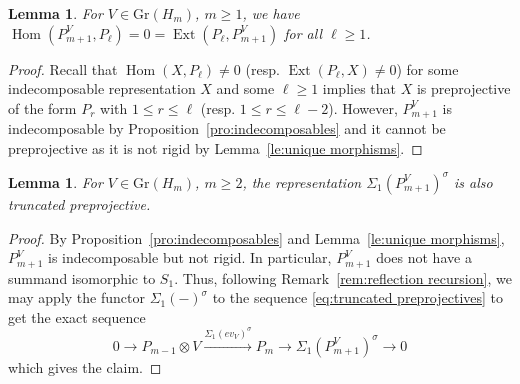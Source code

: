\documentclass{amsart}
\newtheorem{lemma}[theorem]{Lemma}
\numberwithin{equation}{section}
\newcommand\udim{{\underline{\dim}\, }}
\newcommand{\Ext}{\operatorname{Ext}}
\newcommand{\Gr}{\mathrm{Gr}}
\newcommand{\Hom}{\operatorname{Hom}}
\begin{document}
\begin{lemma}
  \label{le:basic homological properties}
  For $V\in\Gr(H_m)$, $m\ge1$, we have $\Hom(P_{m+1}^V,P_\ell)=0=\Ext(P_\ell,P_{m+1}^V)$ for all $\ell\ge1$.
\end{lemma}
\begin{proof}
  Recall that $\Hom(X,P_\ell)\ne0$ (resp. $\Ext(P_\ell,X)\ne0$) for some indecomposable representation $X$ and some $\ell\ge1$ implies that $X$ is preprojective of the form $P_r$ with $1\le r\le\ell$ (resp. $1\le r\le\ell-2$).
  However, $P_{m+1}^V$ is indecomposable by Proposition~\ref{pro:indecomposables} and it cannot be preprojective as it is not rigid by Lemma~\ref{le:unique morphisms}.
\end{proof}

\begin{lemma}
  \label{le:reflected truncated preprojectives}
  For $V\in\Gr(H_m)$, $m\ge2$, the representation $\Sigma_1(P_{m+1}^V)^\sigma$ is also truncated preprojective.
\end{lemma}
\begin{proof}
  By Proposition~\ref{pro:indecomposables} and Lemma~\ref{le:unique morphisms}, $P_{m+1}^V$ is indecomposable but not rigid.
  In particular, $P_{m+1}^V$ does not have a summand isomorphic to $S_1$.
  Thus, following Remark~\ref{rem:reflection recursion}, we may apply the functor $\Sigma_1(-)^\sigma$ to the sequence \eqref{eq:truncated preprojectives} to get the exact sequence
  \[0\longrightarrow P_{m-1}\otimes V\xrightarrow{\Sigma_1(ev_V)^\sigma} P_m\longrightarrow \Sigma_1(P_{m+1}^V)^\sigma\longrightarrow 0\]
  which gives the claim.
\end{proof}
\end{document}
